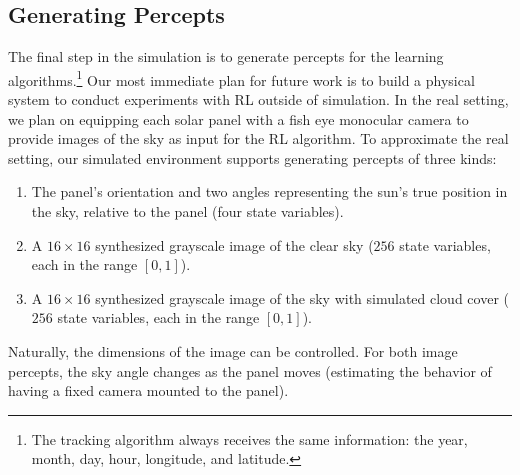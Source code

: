 \documentclass{article}
\begin{document}
{%
\subsection{Generating Percepts}

The final step in the simulation is to generate percepts for the learning algorithms.\footnote{The tracking algorithm always receives the same information: the year, month, day, hour, longitude, and latitude.} Our most immediate plan for future work is to build a physical system to conduct experiments with RL outside of simulation. In the real setting, we plan on equipping each solar panel with a fish eye monocular camera to provide images of the sky as input for the RL algorithm. To approximate the real setting, our simulated environment supports generating percepts of three kinds:
\begin{enumerate}
\item The panel's orientation and two angles representing the sun's true position in the sky, relative to the panel (four state variables).
\item A $16 \times 16$ synthesized grayscale image of the clear sky ($256$ state variables, each in the range $[0,1]$).
\item A $16\times 16$ synthesized grayscale image of the sky with simulated cloud cover ($256$ state variables, each in the range $[0,1]$).
\end{enumerate}
Naturally, the dimensions of the image can be controlled. For both image percepts, the sky angle changes as the panel moves (estimating the behavior of having a fixed camera mounted to the panel).


}
\end{document}
